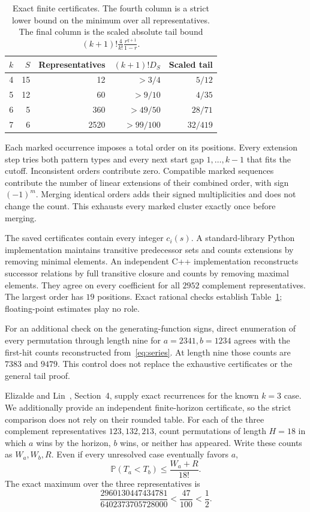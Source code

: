 \documentclass[11pt]{amsart}
\theoremstyle{remark}
\newcommand{\Prb}{\mathbb P}
\begin{document}
\begin{table}[ht]
\centering
\caption{Exact finite certificates. The fourth column is a strict lower bound on the minimum over all representatives. The final column is the scaled absolute tail bound $(k+1)!\frac{4}{k!}\frac{r^{q+1}}{1-r}$.}\label{tab:finite}
\begin{tabular}{rrrrr}
\toprule
$k$ & $S$ & Representatives & $(k+1)!D_S$ & Scaled tail\\
\midrule
4 & 15 & 12   & $>3/4$   & $5/12$\\
5 & 12 & 60   & $>9/10$  & $4/35$\\
6 & 5  & 360  & $>49/50$ & $28/71$\\
7 & 6  & 2520 & $>99/100$ & $32/419$\\
\bottomrule
\end{tabular}
\end{table}

Each marked occurrence imposes a total order on its positions. Every extension step tries both pattern types and every next start gap $1,\ldots,k-1$ that fits the cutoff. Inconsistent orders contribute zero. Compatible marked sequences contribute the number of linear extensions of their combined order, with sign $(-1)^m$. Merging identical orders adds their signed multiplicities and does not change the count. This exhausts every marked cluster exactly once before merging.

The saved certificates contain every integer $c_i(s)$. A standard-library Python implementation maintains transitive predecessor sets and counts extensions by removing minimal elements. An independent C++ implementation reconstructs successor relations by full transitive closure and counts by removing maximal elements. They agree on every coefficient for all $2952$ complement representatives. The largest order has $19$ positions. Exact rational checks establish Table~\ref{tab:finite}; floating-point estimates play no role.

For an additional check on the generating-function signs, direct enumeration of every permutation through length nine for $a=2341,b=1234$ agrees with the first-hit counts reconstructed from~\eqref{eq:series}. At length nine those counts are $7383$ and $9479$. This control does not replace the exhaustive certificates or the general tail proof.

Elizalde and Lin~\cite{ElizaldeLin2026}, Section~4, supply exact recurrences for the known $k=3$ case. We additionally provide an independent finite-horizon certificate, so the strict comparison does not rely on their rounded table. For each of the three complement representatives $123,132,213$, count permutations of length $H=18$ in which $a$ wins by the horizon, $b$ wins, or neither has appeared. Write these counts as $W_a,W_b,R$. Even if every unresolved case eventually favors $a$,
\[
 \Prb(T_a<T_b)\le\frac{W_a+R}{18!}.
\]
The exact maximum over the three representatives is
\[
 \frac{2960130447434781}{6402373705728000}<\frac{47}{100}<\frac12.
\]
\end{document}
